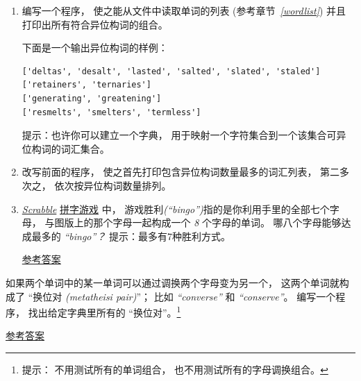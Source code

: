 {\begin{exercise}
\begin{enumerate}
\item 编写一个程序， 使之能从文件中读取单词的列表 (参考章节~{\em \ref{wordlist}}) 并且打印出所有符合异位构词的组合。

下面是一个输出异位构词的样例：

{\em
\begin{lstlisting}
['deltas', 'desalt', 'lasted', 'salted', 'slated', 'staled']
['retainers', 'ternaries']
['generating', 'greatening']
['resmelts', 'smelters', 'termless']
\end{lstlisting}
}

提示：也许你可以建立一个字典， 用于映射一个字符集合到一个该集合可异位构词的词汇集合。

\item 改写前面的程序， 使之首先打印包含异位构词数量最多的词汇列表， 第二多次之， 依次按异位构词数量排列。

\item \href{https://en.wikipedia.org/wiki/Scrabble}{{\em Scrabble}} \href{https://zh.wikipedia.org/wiki/Scrabble}{拼字游戏} 中， 游戏胜利{\em (``bingo'')}指的是你利用手里的全部七个字母， 与图版上的那个字母一起构成一个 {\em 8} 个字母的单词。  哪八个字母能够达成最多的 {\em ``bingo''？} 提示：最多有7种胜利方式。

\href{http://thinkpython2.com/code/anagram_sets.py}{参考答案}

\end{enumerate}

\end{exercise}

\begin{exercise}


如果两个单词中的某一单词可以通过调换两个字母变为另一个， 这两个单词就构成了
``换位对 {\em (metatheisi pair)}''； 比如 {\em ``converse''} 和 {\em ``conserve''}。
编写一个程序， 找出给定字典里所有的 ``换位对''。\footnote{提示： 不用测试所有的单词组合， 也不用测试所有的字母调换组合。  }

\href{http://thinkpython2.com/code/metathesis.py}{参考答案}


\end{exercise}}
